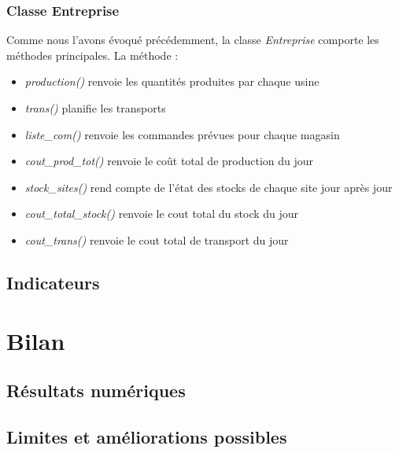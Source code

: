 \documentclass[12pt, a4paper]{article}
\begin{document}
\subsubsection{Classe Entreprise}
Comme nous l'avons évoqué précédemment, la classe \emph{Entreprise} comporte les méthodes principales.
La méthode :
\begin{itemize}
\item \emph{production()} renvoie les quantités produites par chaque usine
\item \emph{trans()} planifie les transports
\item \emph{liste\_com()} renvoie les commandes prévues pour chaque magasin
\item \emph{cout\_prod\_tot()} renvoie le coût total de production du jour
\item \emph{stock\_sites()} rend compte de l'état des stocks de chaque site jour après jour
\item \emph{cout\_total\_stock()} renvoie le cout total du stock du jour 
\item\emph{cout\_trans()} renvoie le cout total de transport du jour
\end{itemize}

\subsection{Indicateurs}


\section{Bilan}
\subsection{Résultats numériques}

\subsection{Limites et améliorations possibles}

\end{document}
